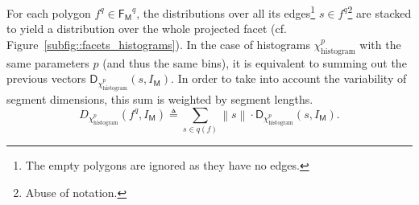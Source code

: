         \begin{figure}[htb]
            \begin{center}
            \end{center}
        \end{figure}

        For each polygon \(f^q \in \mathsf{F_M}^q\), the distributions over all its edges\footnote{The empty polygons are ignored as they have no edges.} \(s \in f^q\)\footnote{Abuse of notation.} are stacked to yield a distribution over the whole projected facet (cf. Figure~\ref{subfig::facets_histograms}).
        In the case of histograms $\chi^p_{\operatorname{histogram}}$ with the same parameters \(p\) (and thus the same bins), it is equivalent to summing out the previous vectors $\mathsf{D}_{\chi^p_{\operatorname{histogram}}}(s, I_{\mathsf{M}})$.
        In order to take into account the variability of segment dimensions, this sum is weighted by segment lengths.\\
        \begin{equation}
            \label{eq::corr_fac}
            D_{\chi^p_{\operatorname{histogram}}}\left(f^q, I_{\mathsf{M}}\right) \triangleq \sum_{s \in q\left(f\right)} \left\rVert s \right\lVert \cdot \mathsf{D}_{\chi^p_{\operatorname{histogram}}}(s, I_{\mathsf{M}}).
        \end{equation}


